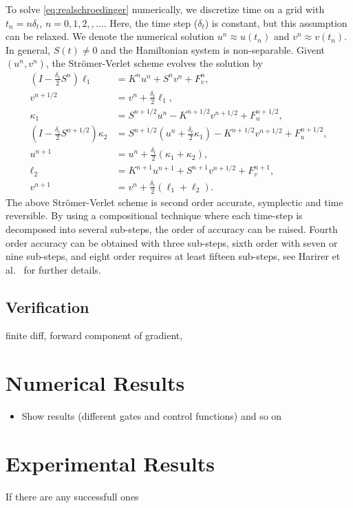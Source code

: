 \documentclass[11pt]{article}
\begin{document}
To solve \eqref{eq:realschroedinger} numerically, we discretize time on a grid with $t_n = n
\delta_t$, $n=0,1,2,,\ldots$. Here, the time step ($\delta_t$) is constant, but this assumption can
be relaxed. We denote the numerical solution $u^n\approx u(t_n)$ and $v^n\approx v(t_n)$.  In
general, $S(t)\ne0$ and the Hamiltonian system is non-separable. Givent $(u^n, v^n)$, the 
Str\"omer-Verlet scheme evolves the solution by
\begin{align*}
  \left(I - \frac{\delta_t}{2} S^{n}\right) \ell_1 &= K^n u^n + S^n v^n + F_v^n,\\
%
  v^{n+1/2} &= v^n + \frac{\delta_t}{2}\ell_1,\\
  \kappa_1 &= S^{n+1/2} u^n - K^{n+1/2} v^{n+1/2} +
  F_u^{n+1/2},\\
%
  \left(I - \frac{\delta_t}{2} S^{n+1/2}\right) \kappa_2 &= S^{n+1/2}\left( u^n + \frac{\delta_t}{2}
  \kappa_1 \right) - K^{n+1/2}  v^{n+1/2} + F_u^{n+1/2},\\
  u^{n+1} &= u^n + \frac{\delta_t}{2}\left( \kappa_1 + \kappa_2 \right),\\
%
  \ell_2 &= K^{n+1} u^{n+1} + S^{n+1}  v^{n+1/2} + F_v^{n+1},\\
  v^{n+1} &= v^n + \frac{\delta_t}{2}\left( \ell_1 + \ell_2 \right).
\end{align*}
%
The above Str\"omer-Verlet scheme is second order accurate, symplectic and time reversible. By using a
compositional technique where each time-step is decomposed into several sub-steps, the order of
accuracy can be raised. Fourth order accuracy can be obtained with three sub-steps, sixth order with
seven or nine sub-steps, and eight order requires at least fifteen sub-steps, see Harirer et
al.~\cite{HairerLubichWanner-06} for further details.

\subsection{Verification}
finite diff, forward component of gradient,


\section{Numerical Results}

\begin{itemize}
  \item Show results (different gates and control functions) and so on
\end{itemize}
\section{Experimental Results}
If there are any successfull ones
\end{document}
